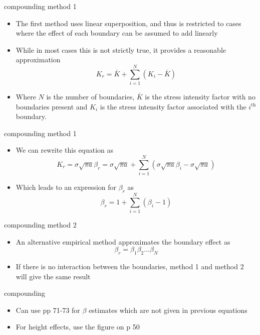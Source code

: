 \documentclass[10pt,handout]{beamer}
\begin{document}
\begin{frame}{compounding method 1}
	\begin{itemize}
		\item The first method uses linear superposition, and thus is restricted to cases where the effect of each boundary can be assumed to add linearly
		\item While in most cases this is not strictly true, it provides a reasonable approximation
		\begin{equation}
		K_r = \bar{K} + \sum_{i=1}^{N}(K_i - \bar{K})
		\end{equation}
		\item Where $N$ is the number of boundaries, $\bar{K}$ is the stress intensity factor with no boundaries present and $K_i$ is the stress intensity factor associated with the $i^{\text{th}}$ boundary.
	\end{itemize}
\end{frame}

\begin{frame}{compounding method 1}
	\begin{itemize}
		\item We can rewrite this equation as
		\begin{equation}
		K_r = \sigma \sqrt{\pi a} \beta_r = \sigma \sqrt{\pi a} + \sum_{i=1}^{N}(\sigma \sqrt{\pi a}\beta_i - \sigma \sqrt{\pi a})
		\end{equation}
		\item Which leads to an expression for $\beta_r$ as
		\begin{equation}
		\beta_r = 1+\sum_{i=1}^{N} (\beta_i - 1)
		\end{equation}
	\end{itemize}
\end{frame}

\begin{frame}{compounding method 2}
	\begin{itemize}
		\item An alternative empirical method approximates the boundary effect as
		\begin{equation}
		\beta_r = \beta_1 \beta_2 ... \beta_N
		\end{equation}
		\item If there is no interaction between the boundaries, method 1 and method 2 will give the same result
	\end{itemize}
\end{frame}

\begin{frame}{compounding}
	\begin{itemize}
		\item Can use pp 71-73 for $\beta$ estimates which are not given in previous equations
		\item For height effects, use the figure on p 50
	\end{itemize}
\end{frame}
\end{document}
